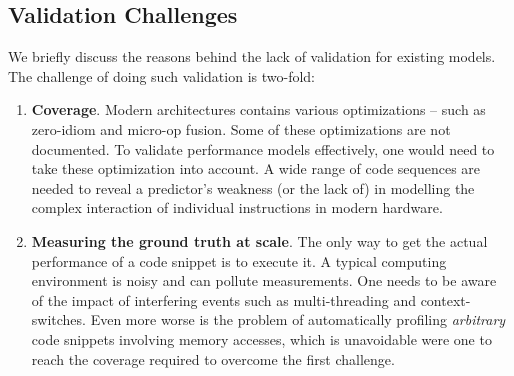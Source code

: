 \subsection{Validation Challenges}
We briefly discuss the reasons behind the lack of validation for existing models.
The challenge of doing such validation is two-fold:
\begin{enumerate}
    \item \textbf{Coverage}.
    Modern architectures contains various optimizations --
    such as zero-idiom and micro-op fusion.
    Some of these optimizations are not documented.
    To validate performance models effectively, one would need to take 
    these optimization into account.
    A wide range of code sequences are needed to reveal a predictor's 
    weakness (or the lack of) in modelling the complex interaction of 
    individual instructions in modern hardware.
    
    \item \textbf{Measuring the ground truth at scale}.
    The only way to get the actual performance of a code snippet is
    to execute it.
    A typical computing environment is noisy and can pollute measurements.
    One needs to be aware of the impact of interfering events such as
    multi-threading and context-switches.
    Even more worse is the problem of automatically profiling 
    \textit{arbitrary} code snippets involving memory accesses,
    which is unavoidable were one to reach the coverage required to
    overcome the first challenge.
\end{enumerate}


